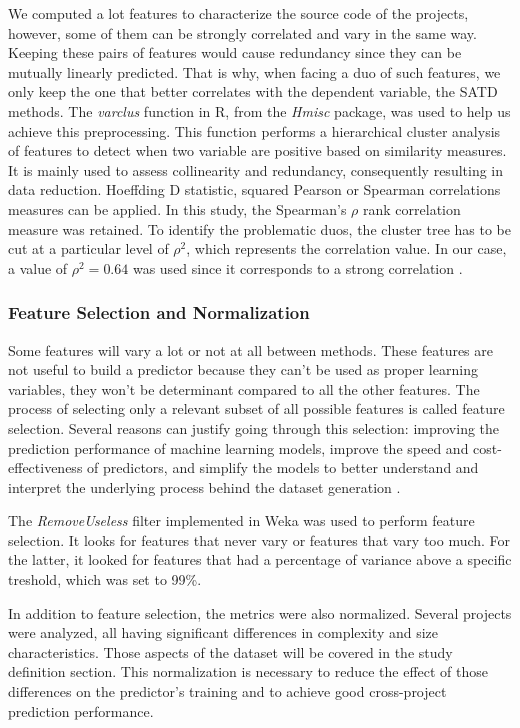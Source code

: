 We computed a lot features to characterize the source code of the projects, however, some of them can be strongly correlated and vary in the same way. Keeping these pairs of features would cause redundancy since they can be mutually linearly predicted. That is why, when facing a duo of such features, we only keep the one that better correlates with the dependent variable, the \ac{SATD} methods. The \emph{varclus} function in R, from the \emph{Hmisc} package, was used to help us achieve this preprocessing. This function performs a hierarchical cluster analysis of features to detect when two variable are positive based on similarity measures. It is mainly used to assess collinearity and redundancy, consequently resulting in data reduction. Hoeffding D statistic, squared Pearson or Spearman correlations measures can be applied. In this study, the Spearman's $\rho$ rank correlation measure was retained. To identify the problematic duos, the cluster tree has to be cut at a particular level of $\rho^2$, which represents the correlation value. In our case, a value of $\rho^2=0.64$ was used since it corresponds to a strong correlation \citep{Cohen-1988}.

\subsubsection{Feature Selection and Normalization}

Some features will vary a lot or not at all between methods. These features are not useful to build a predictor because they can't be used as proper learning variables, they won't be determinant compared to all the other features. The process of selecting only a relevant subset of all possible features is called feature selection. Several reasons can justify going through this selection: improving the prediction performance of machine learning models, improve the speed and cost-effectiveness of predictors, and simplify the models to better understand and interpret the underlying process behind the dataset generation \citep{guyon2003introduction}. \par 

The \emph{RemoveUseless} filter implemented in Weka \citep{hall2009weka} was used to perform feature selection. It looks for features that never vary or features that vary too much. For the latter, it looked for features that had a percentage of variance above a specific treshold, which was set to 99\%. \par 

In addition to feature selection, the metrics were also normalized. Several projects were analyzed, all having significant differences in complexity and size characteristics. Those aspects of the dataset will be covered in the study definition section. This normalization is necessary to reduce the effect of those differences on the predictor's training and to achieve good cross-project prediction performance.


